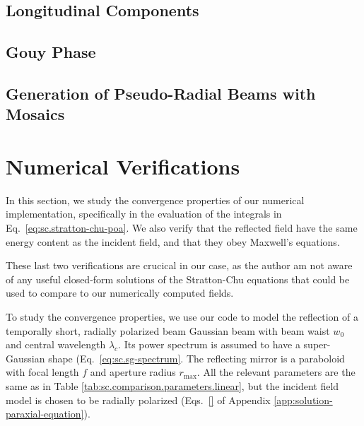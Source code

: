 \documentclass[11pt,SymmetricalJury]{inrsthesis/inrsthesis}
\begin{document}
\subsection{Longitudinal Components}


\subsection{Gouy Phase}


\subsection{Generation of Pseudo-Radial Beams with Mosaics}



\section{Numerical Verifications}

In this section, we study the convergence properties of our numerical
implementation, specifically in the evaluation of the integrals in
Eq.~\eqref{eq:sc.stratton-chu-poa}. We also verify that the reflected field have
the same energy content as the incident field, and that they obey Maxwell's
equations.

These last two verifications are crucical in our case, as the author am not
aware of any useful closed-form solutions of the Stratton-Chu equations that
could be used to compare to our numerically computed fields.

To study the convergence properties, we use our code to model the reflection of
a temporally short, radially polarized beam Gaussian beam with beam waist $w_0$
and central wavelength $\lambda_c$. Its power spectrum is assumed to have a
super-Gaussian shape (Eq.~\ref{eq:sc.sg-spectrum}. The reflecting mirror is a
paraboloid with focal length $f$ and aperture radius $r_\text{max}$. All the
relevant parameters are the same as in Table
\ref{tab:sc.comparison.parameters.linear}, but the incident field model is
chosen to be radially polarized (Eqs.~\eqref{} of Appendix
\ref{app:solution-paraxial-equation}).
\end{document}
